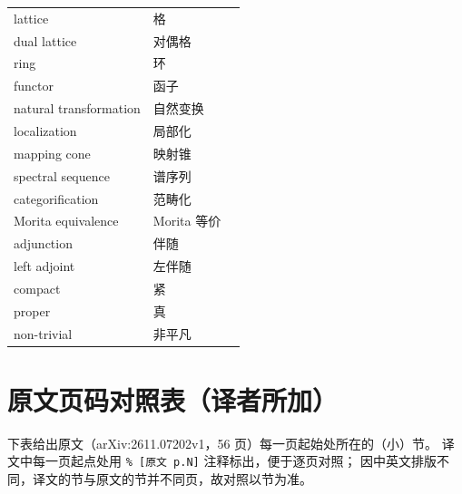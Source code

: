 \documentclass[11pt,a4paper]{article}
\theoremstyle{cnth}
\begin{document}
{\begin{longtable}{p{5.0cm}p{5.6cm}p{3.6cm}}
lattice & 格 &  \\
dual lattice & 对偶格 &  \\
ring & 环 &  \\
functor & 函子 &  \\
natural transformation & 自然变换 &  \\
localization & 局部化 &  \\
mapping cone & 映射锥 &  \\
spectral sequence & 谱序列 &  \\
categorification & 范畴化 &  \\
Morita equivalence & Morita 等价 &  \\
adjunction & 伴随 &  \\
left adjoint & 左伴随 &  \\
compact & 紧 &  \\
proper & 真 &  \\
non-trivial & 非平凡 &  \\
\end{longtable}
}

\section{原文页码对照表（译者所加）}
\label{sec:pagemap}
下表给出原文（arXiv:2611.07202v1，56 页）每一页起始处所在的（小）节。
译文中每一页起点处用 \verb|% [原文 p.N]| 注释标出，便于逐页对照；
因中英文排版不同，译文的节与原文的节并不同页，故对照以节为准。
\end{document}
